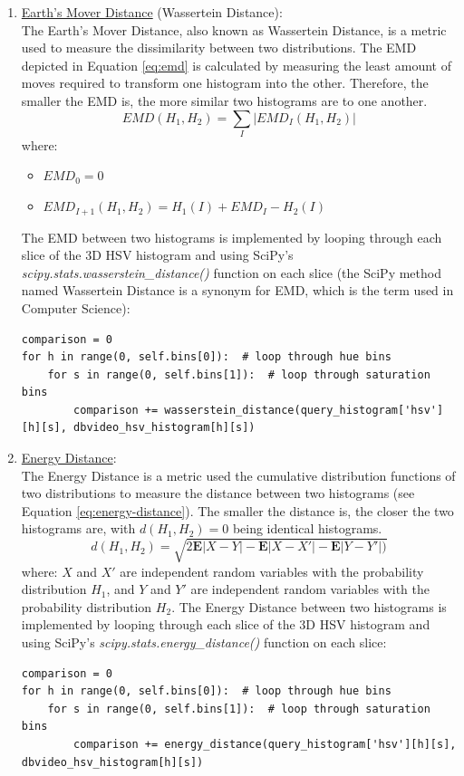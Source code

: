 \begin{enumerate}
    \item \underline{Earth's Mover Distance} (Wassertein Distance):\\
    The Earth's Mover Distance, also known as Wassertein Distance, is a metric used to measure the dissimilarity between two distributions. The EMD depicted in Equation \ref{eq:emd} is calculated by measuring the least amount of moves required to transform one histogram into the other. Therefore, the smaller the EMD is, the more similar two histograms are to one another.
    \begin{equation}
    \label{eq:emd}
        EMD(H_1,H_2)=\sum_I |EMD_I(H_1,H_2)|
    \end{equation}
    where:
        \begin{itemize}
            \item $EMD_0 = 0$
            \item $EMD_{I+1}(H_1,H_2) = H_1(I)+EMD_I-H_2(I)$
        \end{itemize}
    The EMD between two histograms is implemented by looping through each slice of the 3D HSV histogram and using SciPy's \textit{scipy.stats.wasserstein\_distance()} function on each slice (the SciPy method named Wassertein Distance is a synonym for EMD, which is the term used in Computer Science):
\begin{lstlisting}[numbers=none]
comparison = 0
for h in range(0, self.bins[0]):  # loop through hue bins
    for s in range(0, self.bins[1]):  # loop through saturation bins
        comparison += wasserstein_distance(query_histogram['hsv'][h][s], dbvideo_hsv_histogram[h][s])
\end{lstlisting}
        
    \item \underline{Energy Distance}:\\
    The Energy Distance is a metric used the cumulative distribution functions of two distributions to measure the distance between two histograms (see Equation \ref{eq:energy-distance}). The smaller the distance is, the closer the two histograms are, with $d(H_1,H_2)=0$ being identical histograms.
    \begin{equation}
    \label{eq:energy-distance}
        d(H_1,H_2) = \sqrt{2\mathbf{E}|X-Y|-\mathbf{E}|X-X'|-\mathbf{E}|Y-Y'|)}
    \end{equation}
    where: $X$ and $X'$ are independent random variables with the probability distribution $H_1$, and $Y$ and $Y'$ are independent random variables with the probability distribution $H_2$.  The Energy Distance between two histograms is implemented by looping through each slice of the 3D HSV histogram and using SciPy's \textit{scipy.stats.energy\_distance()} function on each slice:
\begin{lstlisting}[numbers=none]
comparison = 0
for h in range(0, self.bins[0]):  # loop through hue bins
    for s in range(0, self.bins[1]):  # loop through saturation bins
        comparison += energy_distance(query_histogram['hsv'][h][s], dbvideo_hsv_histogram[h][s])
\end{lstlisting}
    
\end{enumerate}

